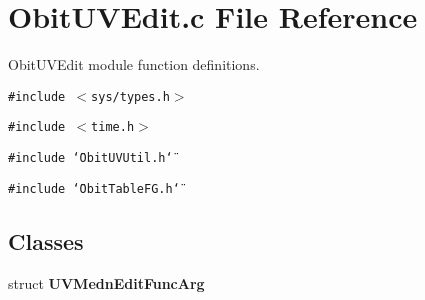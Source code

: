 \section{Obit\-UVEdit.c File Reference}
\label{ObitUVEdit_8c}
Obit\-UVEdit module function definitions. 

{\tt \#include $<$sys/types.h$>$}\par
{\tt \#include $<$time.h$>$}\par
{\tt \#include \char`\"{}Obit\-UVUtil.h\char`\"{}}\par
{\tt \#include \char`\"{}Obit\-Table\-FG.h\char`\"{}}\par
\subsection*{Classes}
\begin{CompactItemize}
\item 
struct {\bf UVMedn\-Edit\-Func\-Arg}
\end{CompactItemize}
